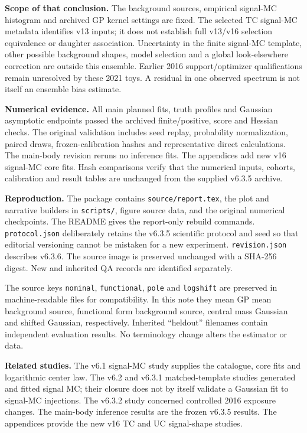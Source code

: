 \documentclass[11pt]{article}
\begin{document}
\textbf{Scope of that conclusion.} The background sources, empirical signal-MC histogram and archived GP kernel settings are fixed. The selected TC signal-MC metadata identifies v13 inputs; it does not establish full v13/v16 selection equivalence or daughter association. Uncertainty in the finite signal-MC template, other possible background shapes, model selection and a global look-elsewhere correction are outside this ensemble. Earlier 2016 support/optimizer qualifications remain unresolved by these 2021 toys. A residual in one observed spectrum is not itself an ensemble bias estimate.

\textbf{Numerical evidence.} All main planned fits, truth profiles and Gaussian asymptotic endpoints passed the archived finite/positive, score and Hessian checks. The original validation includes seed replay, probability normalization, paired draws, frozen-calibration hashes and representative direct calculations. The main-body revision reruns no inference fits. The appendices add new v16 signal-MC core fits. Hash comparisons verify that the numerical inputs, cohorts, calibration and result tables are unchanged from the supplied v6.3.5 archive.

\textbf{Reproduction.} The package contains \texttt{source/report.tex}, the plot and narrative builders in \texttt{scripts/}, figure source data, and the original numerical checkpoints. The README gives the report-only rebuild commands. \texttt{protocol.json} deliberately retains the v6.3.5 scientific protocol and seed so that editorial versioning cannot be mistaken for a new experiment. \texttt{revision.json} describes v6.3.6. The source image is preserved unchanged with a SHA-256 digest. New and inherited QA records are identified separately.

The source keys \texttt{nominal}, \texttt{functional}, \texttt{pole} and \texttt{logshift} are preserved in machine-readable files for compatibility. In this note they mean GP mean background source, functional form background source, central mass Gaussian and shifted Gaussian, respectively. Inherited ``heldout'' filenames contain independent evaluation results. No terminology change alters the estimator or data.

\textbf{Related studies.} The v6.1 signal-MC study supplies the catalogue, core fits and logarithmic center law. The v6.2 and v6.3.1 matched-template studies generated and fitted signal MC; their closure does not by itself validate a Gaussian fit to signal-MC injections. The v6.3.2 study concerned controlled 2016 exposure changes. The main-body inference results are the frozen v6.3.5 results. The appendices provide the new v16 TC and UC signal-shape studies.
\end{document}
